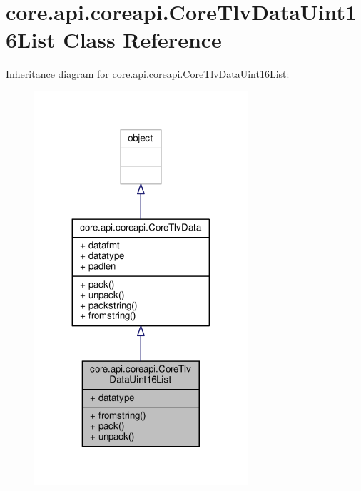\hypertarget{classcore_1_1api_1_1coreapi_1_1_core_tlv_data_uint16_list}{\section{core.\+api.\+coreapi.\+Core\+Tlv\+Data\+Uint16\+List Class Reference}
\label{classcore_1_1api_1_1coreapi_1_1_core_tlv_data_uint16_list}
}


Inheritance diagram for core.\+api.\+coreapi.\+Core\+Tlv\+Data\+Uint16\+List\+:
\nopagebreak
\begin{figure}[H]
\begin{center}
\leavevmode
\includegraphics[width=224pt]{classcore_1_1api_1_1coreapi_1_1_core_tlv_data_uint16_list__inherit__graph}
\end{center}
\end{figure}


